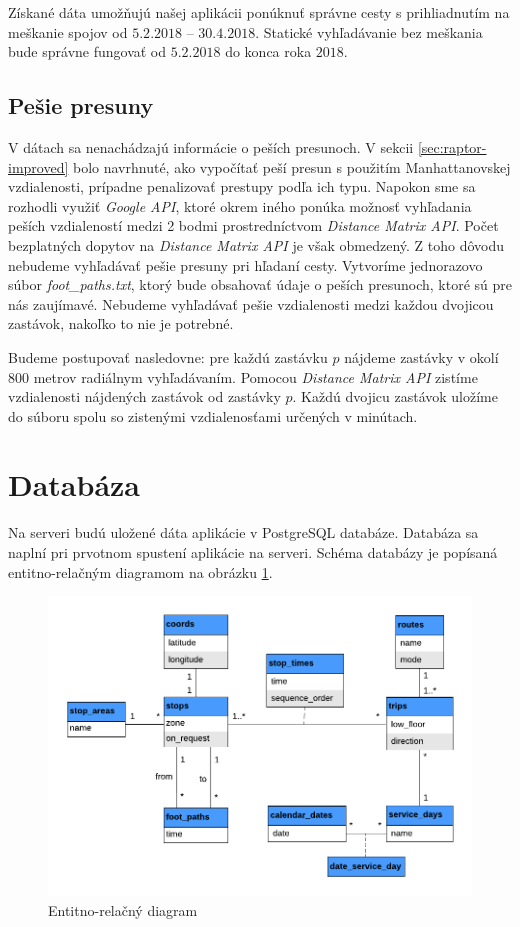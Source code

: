 Získané dáta umožňujú našej aplikácii ponúknuť správne cesty s prihliadnutím na meškanie spojov od $5.2.2018$ – $30.4.2018$. Statické vyhľadávanie bez meškania bude správne fungovať od $5.2.2018$ do konca roka $2018$.


\subsection{Pešie presuny}
\label{sec:foot-paths}
V dátach sa nenachádzajú informácie o peších presunoch. V sekcii \ref{sec:raptor-improved} bolo navrhnuté, ako vypočítať peší presun s použitím Manhattanovskej vzdialenosti, prípadne penalizovať prestupy podľa ich typu. Napokon sme sa rozhodli využiť   \textit{Google API}, ktoré okrem iného ponúka možnosť vyhľadania peších vzdialeností medzi 2 bodmi prostredníctvom \textit{Distance Matrix API}. Počet bezplatných dopytov na \textit{Distance Matrix API} je však obmedzený. Z toho dôvodu nebudeme vyhľadávať pešie presuny pri hľadaní cesty. Vytvoríme jednorazovo súbor \textit{foot\_paths.txt}, ktorý bude obsahovať údaje o peších presunoch, ktoré sú pre nás zaujímavé. Nebudeme vyhľadávať pešie vzdialenosti medzi každou dvojicou zastávok, nakoľko to nie je potrebné. 

Budeme postupovať nasledovne: pre každú zastávku $p$ nájdeme zastávky v okolí 800 metrov radiálnym vyhľadávaním. Pomocou \textit{Distance Matrix API} zistíme vzdialenosti nájdených zastávok od zastávky $p$. Každú dvojicu zastávok uložíme do súboru spolu so zistenými vzdialenosťami určených v minútach.

\section{Databáza}

Na serveri budú uložené dáta aplikácie v PostgreSQL databáze. Databáza sa naplní pri prvotnom spustení aplikácie na serveri. Schéma databázy je popísaná entitno-relačným diagramom na obrázku \ref{fig:erd}.

\begin{figure}[H]
\centerline{\includegraphics[width=1.0\textwidth]{images/ERD}}
\caption[Entitno-relačný diagram]{Entitno-relačný diagram}
\label{fig:erd}
\end{figure}

